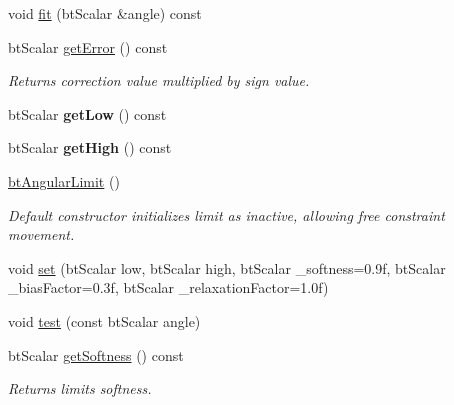 \begin{DoxyCompactItemize}
void \hyperlink{classbtAngularLimit_aba82fc7d176c0b4e483eb3959f84eb65}{fit} (bt\+Scalar \&angle) const
\item 
\mbox{\label{classbtAngularLimit_a781f6596d248dbd0bc074069ca3bde2a}} 
bt\+Scalar \hyperlink{classbtAngularLimit_a781f6596d248dbd0bc074069ca3bde2a}{get\+Error} () const
\begin{DoxyCompactList}\small\item\em Returns correction value multiplied by sign value. \end{DoxyCompactList}\item 
\mbox{\label{classbtAngularLimit_a2c131db6c0d9a10f3631b54a1075b4cd}} 
bt\+Scalar {\bfseries get\+Low} () const
\item 
\mbox{\label{classbtAngularLimit_a45dee16704e05e7e0fa485fe150f61f0}} 
bt\+Scalar {\bfseries get\+High} () const
\item 
\mbox{\label{classbtAngularLimit_ac3364359851713e6cb32b16611e9331d}} 
\hyperlink{classbtAngularLimit_ac3364359851713e6cb32b16611e9331d}{bt\+Angular\+Limit} ()
\begin{DoxyCompactList}\small\item\em Default constructor initializes limit as inactive, allowing free constraint movement. \end{DoxyCompactList}\item 
void \hyperlink{classbtAngularLimit_aae9e0c21886c2f98f9ad1928bf024b3f}{set} (bt\+Scalar low, bt\+Scalar high, bt\+Scalar \+\_\+softness=0.\+9f, bt\+Scalar \+\_\+bias\+Factor=0.\+3f, bt\+Scalar \+\_\+relaxation\+Factor=1.\+0f)
\item 
void \hyperlink{classbtAngularLimit_aa8908e320fa18257118bbe81948142d8}{test} (const bt\+Scalar angle)
\item 
\mbox{\label{classbtAngularLimit_a53fcf2522b1988022f21e0ef2cde1b4c}} 
bt\+Scalar \hyperlink{classbtAngularLimit_a53fcf2522b1988022f21e0ef2cde1b4c}{get\+Softness} () const
\begin{DoxyCompactList}\small\item\em Returns limit\textquotesingle{}s softness. \end{DoxyCompactList}\item 
\mbox{\label{classbtAngularLimit_a2ba4c0092e8fd39cdf09113b6aedd740}} 

\end{DoxyCompactItemize}

